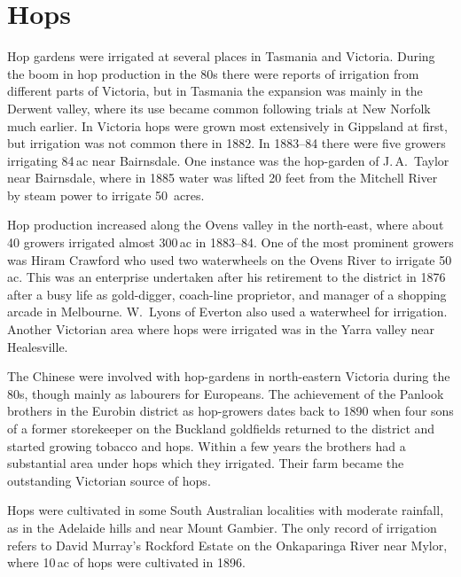 \section*{Hops}

Hop gardens were irrigated at several places in Tasmania and Victoria.
During the boom in hop production in the 80s there were reports of
irrigation from different parts of Victoria, but in Tasmania the
expansion was mainly in the Derwent valley, where its use became
common following trials at New Norfolk much earlier.  In Victoria hops
were grown most extensively in Gippsland at first, but irrigation was
not common there in 1882. In 1883--84 there were five growers
irrigating 84\,ac near Bairnsdale.  One instance was the hop-garden of
J.\,A.~Taylor near Bairnsdale, where in 1885 water was lifted 20 feet
from the Mitchell River by steam power to irrigate
50~acres.

Hop production increased along the Ovens valley in the north-east,
where about 40 growers irrigated almost 300\,ac in 1883--84. One of
the most prominent growers was Hiram Crawford who used two waterwheels
on the Ovens River to irrigate 50\,ac. This was an enterprise
undertaken after his retirement to the district in 1876 after a busy
life as gold-digger, coach-line proprietor, and manager of a shopping
arcade in Melbourne.  W.~Lyons of Everton also used a waterwheel for
irrigation.  Another Victorian area where hops were irrigated was in
the Yarra valley near Healesville.

The Chinese were involved with hop-gardens in north-eastern Victoria
during the 80s, though mainly as labourers for Europeans. The
achievement of the Panlook brothers in the Eurobin district as
hop-growers dates back to 1890 when four sons of a former storekeeper
on the Buckland goldfields returned to the district and started
growing tobacco and hops.  Within a few years the brothers had a
substantial area under hops which they irrigated. Their farm became
the outstanding Victorian source of hops.

Hops were cultivated in some South Australian localities with moderate
rainfall, as in the Adelaide hills and near Mount Gambier.  The only
record of irrigation refers to David Murray's Rockford Estate on the
Onkaparinga River near Mylor, where 10\,ac of hops were cultivated in
1896.

